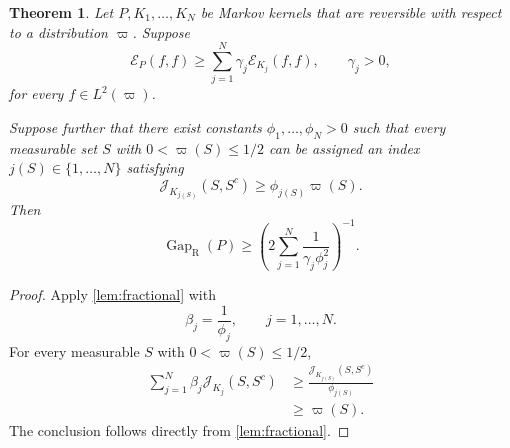 \documentclass[11pt]{article}
\newtheorem{theorem}{Theorem}[section]
\newtheorem{remark}[remark]{Remark}
\newcommand{\Gap}{\operatorname{Gap}_{\mathrm{R}}}
\newcommand{\cE}{\mathcal E}
\newcommand{\1}{\mathbf 1}
\begin{document}
	\begin{theorem}
		\label{thm:aggregation}
		Let \(P,K_1,\ldots,K_N\) be Markov kernels that are reversible with
		respect to a distribution \(\varpi\).  Suppose
		\[
		\cE_P(f,f)
		\geq
		\sum_{j=1}^N
		\gamma_j\cE_{K_j}(f,f),
		\qquad
		\gamma_j>0,
		\]
		for every \(f\in L^2(\varpi)\).
		
		Suppose further that there exist constants
		\(\phi_1,\ldots,\phi_N>0\) such that every measurable set \(S\) with
		\(0<\varpi(S)\leq1/2\) can be assigned an index
		\(j(S)\in\{1,\ldots,N\}\) satisfying
		\[
		\mathcal{J}_{K_{j(S)}}(S,S^c)
		\geq
		\phi_{j(S)}\varpi(S).
		\]
		Then
		\[
		\Gap(P)
		\geq
		\left(
		2\sum_{j=1}^N
		\frac{1}{\gamma_j\phi_j^2}
		\right)^{-1}.
		\]
	\end{theorem}
	
	\begin{proof}
		Apply \cref{lem:fractional} with
		\[
		\beta_j=\frac1{\phi_j},
		\qquad j=1,\ldots,N.
		\]
		For every measurable \(S\) with \(0<\varpi(S)\leq1/2\),
		\[
		\begin{aligned}
			\sum_{j=1}^N
			\beta_j\mathcal{J}_{K_j}(S,S^c)
			&\geq
			\frac{
				\mathcal{J}_{K_{j(S)}}(S,S^c)
			}{
				\phi_{j(S)}
			}\\
			&\geq
			\varpi(S).
		\end{aligned}
		\]
		The conclusion follows directly from \cref{lem:fractional}.
	\end{proof}
	
	
\end{document}
